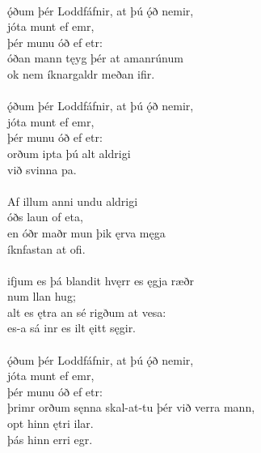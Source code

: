  \\

\bva {}ǫ́ðum þér Loddfáfnir, \hld at þú ǫ́ð nemir, \\%
\ind {}jóta munt ef emr, \\%
\ind þér munu óð ef etr: \\%
óðan mann \hld tęyg þér at amanrúnum \\%
\ind ok nem íknargaldr meðan ifir.\\%

 \\

\bva {}ǫ́ðum þér Loddfáfnir, \hld at þú ǫ́ð nemir, \\%
\ind {}jóta munt ef emr, \\%
\ind þér munu óð ef etr: \\%
orðum ipta \hld þú alt aldrigi \\%
\ind við svinna pa.\\%

 \\

\bva Af illum anni \hld {}undu aldrigi \\%
\ind {}óðs laun of eta, \\%
en óðr maðr \hld mun þik ęrva męga \\%
\ind {}íknfastan at ofi.\\%

 \\

\bva {}ifjum es þá blandit \hld hvęrr es ęgja ræðr \\%
\ind {}num llan hug; \\%
alt es ętra \hld an sé rigðum at vesa: \\%
\ind es-a sá inr es ilt ęitt sęgir.\\%

 \\

\bva {}ǫ́ðum þér Loddfáfnir, \hld at þú ǫ́ð nemir, \\%
\ind {}jóta munt ef emr, \\%
\ind þér munu óð ef etr: \\%
þrimr orðum sęnna \hld skal-at-tu þér við verra mann, \\%
\ind opt hinn ętri ilar. \\%
\ind þás hinn erri egr.\\%

